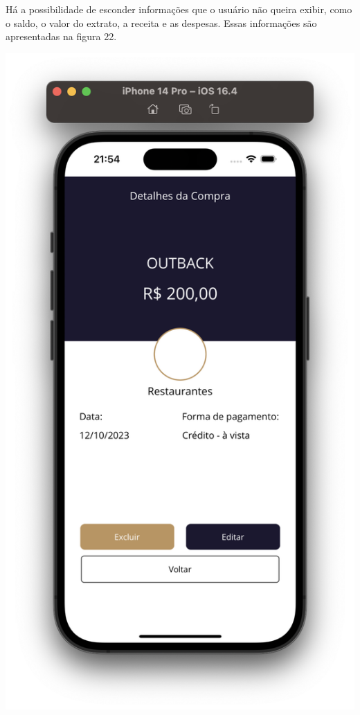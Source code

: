 \begin{center}
\begin{minipage}{\textwidth}
            \label{fig:figura21}
        \end{minipage}
    \end{center}  

Há a possibilidade de esconder informações que o usuário não queira exibir, como o saldo, o valor do extrato, a receita e as despesas. Essas informações são apresentadas na figura 22.

    \vspace{\baselineskip}
    \begin{center}
        \begin{minipage}{\textwidth}
            \centering
            \includegraphics[scale=0.2]{figs/fig22.png}
            \label{fig:figura22}
        \end{minipage}
    \end{center}  

